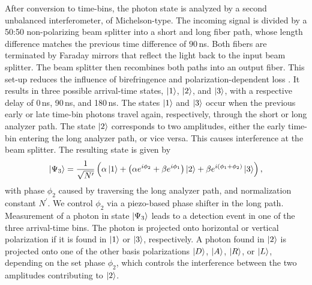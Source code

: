 \documentclass[reprint, superscriptaddress, longbibliography, floatfix, twocolumn, nofootinbib, amsmath, amssymb, aps, showkeys]{revtex4-2}
\newcommand{\CH}[1]{{\textbf{\color{violet}[#1]}}}
\begin{document}
After conversion to time-bins, the photon state is analyzed by a second unbalanced interferometer, of Michelson-type. The incoming signal is divided by a 50:50 non-polarizing beam splitter into a short and long fiber path, whose length difference matches the previous time difference of $90\,$ns. Both fibers are terminated by Faraday mirrors that reflect the light back to the input beam splitter. The beam splitter then recombines both paths into an output fiber. This set-up reduces the influence of birefringence and polarization-dependent loss \cite{Muller_1997}. It results in three possible arrival-time states, $\ket{1}$, $\ket{2}$, and $\ket{3}$, with a respective delay of 0\,ns, 90\,ns, and 180\,ns. The states $\ket{1}$ and $\ket{3}$ occur when the previous early or late time-bin photons travel again, respectively, through the short or long analyzer path. The state $\ket{2}$ corresponds to two amplitudes, either the early time-bin entering the long analyzer path, or vice versa. This causes interference at the beam splitter. The resulting state is given by
\begin{align}
\label{equ:analyzer}
    \ket{\Psi_3}=\frac{1}{\sqrt{N^{\prime}}}\left(\alpha\ket{1}+\left(\alpha  e^{i\phi_2}+\beta e^{i\phi_1}\right)\ket{2}+\beta e^{i(\phi_1+\phi_2)}\ket{3}\right),  
\end{align}
with phase $\phi_2$ caused by traversing the long analyzer path, and normalization constant $N^{\prime}$. We control $\phi_2$ via a piezo-based phase shifter in the long path. %
Measurement of a photon in state $\ket{\Psi_3}$ leads to a detection event in one of the three arrival-time bins. The photon is projected onto horizontal or vertical polarization if it is found in $\ket{1}$ or $\ket{3}$, respectively. A photon found in $\ket{2}$ is projected onto one of the other basis polarizations $\ket{D}$, $\ket{A}$, $\ket{R}$, or $\ket{L}$, depending on the set phase $\phi_2$, which controls the interference between the two amplitudes contributing to $\ket{2}$. 
\end{document}
